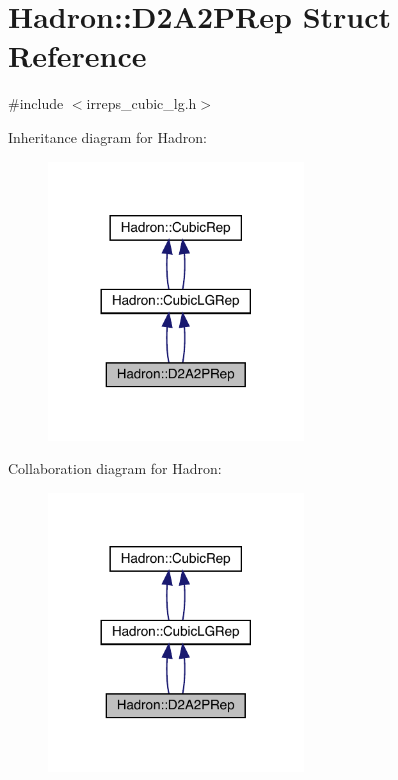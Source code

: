 \hypertarget{structHadron_1_1D2A2PRep}{}\section{Hadron\+:\+:D2\+A2\+P\+Rep Struct Reference}
\label{structHadron_1_1D2A2PRep}


{\ttfamily \#include $<$irreps\+\_\+cubic\+\_\+lg.\+h$>$}



Inheritance diagram for Hadron\+:\nopagebreak
\begin{figure}[H]
\begin{center}
\leavevmode
\includegraphics[width=192pt]{d0/d99/structHadron_1_1D2A2PRep__inherit__graph}
\end{center}
\end{figure}


Collaboration diagram for Hadron\+:\nopagebreak
\begin{figure}[H]
\begin{center}
\leavevmode
\includegraphics[width=192pt]{de/d1c/structHadron_1_1D2A2PRep__coll__graph}
\end{center}
\end{figure}
